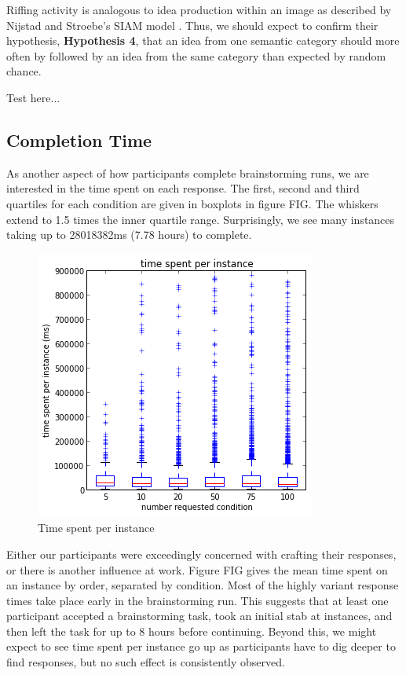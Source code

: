 Riffing activity is analogous to idea production within an image as described by Nijstad and Stroebe's SIAM model \cite{nijstad_how_2006}. Thus, we should expect to confirm their hypothesis, \textbf{Hypothesis 4}, that an idea from one semantic category should more often by followed by an idea from the same category than expected by random chance.

Test here...

\subsection{Completion Time}

As another aspect of how participants complete brainstorming runs, we are interested in the time spent on each response. The first, second and third quartiles for each condition are given in boxplots in figure FIG. The whiskers extend to 1.5 times the inner quartile range. Surprisingly, we see many instances taking up to 28018382ms (7.78 hours) to complete.

\begin{figure}[h]
    \centering
    \includegraphics[width=0.9\columnwidth]{time_spent_condition}
    \caption{Time spent per instance}
\end{figure}

Either our participants were exceedingly concerned with crafting their responses, or there is another influence at work. Figure FIG gives the mean time spent on an instance by order, separated by condition. Most of the highly variant response times take place early in the brainstorming run. This suggests that at least one participant accepted a brainstorming task, took an initial stab at instances, and then left the task for up to 8 hours before continuing. Beyond this, we might expect to see time spent per instance go up as participants have to dig deeper to find responses, but no such effect is consistently observed.

